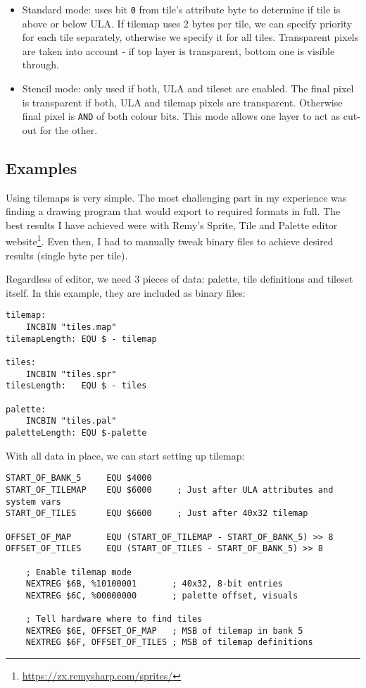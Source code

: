 \begin{itemize}[topsep=1pt,itemsep=1pt]
    \item Standard mode: uses bit {\tt 0} from tile's attribute byte to determine if tile is above or below ULA. If tilemap uses 2 bytes per tile, we can specify priority for each tile separately, otherwise we specify it for all tiles. Transparent pixels are taken into account - if top layer is transparent, bottom one is visible through.
	
    \item Stencil mode: only used if both, ULA and tileset are enabled. The final pixel is transparent if both, ULA and tilemap pixels are transparent. Otherwise final pixel is {\tt AND} of both colour bits. This mode allows one layer to act as cut-out for the other.
\end{itemize}


\subsection{Examples}

Using tilemaps is very simple. The most challenging part in my experience was finding a drawing program that would export to required formats in full. The best results I have achieved were with Remy's Sprite, Tile and Palette editor website\footnote{\url{https://zx.remysharp.com/sprites/}}. Even then, I had to manually tweak binary files to achieve desired results (single byte per tile).

Regardless of editor, we need 3 pieces of data: palette, tile definitions and tileset itself. In this example, they are included as binary files:

\begin{lstlisting}
tilemap:
    INCBIN "tiles.map"
tilemapLength: EQU $ - tilemap

tiles:
    INCBIN "tiles.spr"
tilesLength:   EQU $ - tiles

palette:
    INCBIN "tiles.pal"
paletteLength: EQU $-palette
\end{lstlisting}

With all data in place, we can start setting up tilemap:

\begin{lstlisting}
START_OF_BANK_5     EQU $4000
START_OF_TILEMAP    EQU $6000     ; Just after ULA attributes and system vars
START_OF_TILES      EQU $6600     ; Just after 40x32 tilemap

OFFSET_OF_MAP       EQU (START_OF_TILEMAP - START_OF_BANK_5) >> 8
OFFSET_OF_TILES     EQU (START_OF_TILES - START_OF_BANK_5) >> 8

    ; Enable tilemap mode
    NEXTREG $6B, %10100001       ; 40x32, 8-bit entries
    NEXTREG $6C, %00000000       ; palette offset, visuals

    ; Tell hardware where to find tiles
    NEXTREG $6E, OFFSET_OF_MAP   ; MSB of tilemap in bank 5
    NEXTREG $6F, OFFSET_OF_TILES ; MSB of tilemap definitions
\end{lstlisting}

